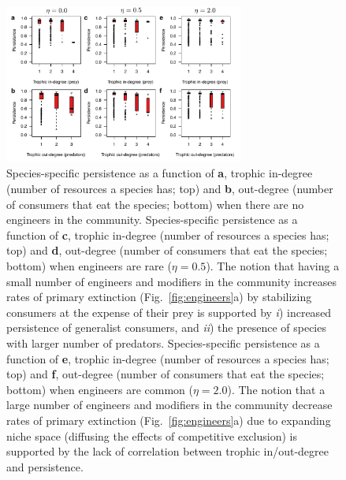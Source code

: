 \documentclass[twocolumn,preprintnumbers,amsmath,amssymb,superscriptaddress,linenumbers]{revtex4-1}
\begin{document}
\begin{figure}[h!]
\centering
\includegraphics[width=0.7\textwidth]{fig_indeng_combined.pdf}
\caption{
Species-specific persistence as a function of \textbf{a}, trophic in-degree (number of resources a species has; top) and \textbf{b}, out-degree (number of consumers that eat the species; bottom) when there are no engineers in the community. 
Species-specific persistence as a function of \textbf{c}, trophic in-degree (number of resources a species has; top) and \textbf{d}, out-degree (number of consumers that eat the species; bottom) when engineers are rare ($\eta = 0.5$).
The notion that having a small number of engineers and modifiers in the community increases rates of primary extinction (Fig.\ \ref{fig:engineers}a) by stabilizing consumers at the expense of their prey is supported by \emph{i}) increased persistence of generalist consumers, and \emph{ii}) the presence of species with larger number of predators.
Species-specific persistence as a function of \textbf{e}, trophic in-degree (number of resources a species has; top) and \textbf{f}, out-degree (number of consumers that eat the species; bottom) when engineers are common ($\eta = 2.0$).
The notion that a large number of engineers and modifiers in the community decrease rates of primary extinction (Fig.\ \ref{fig:engineers}a) due to expanding niche space (diffusing the effects of competitive exclusion) is supported by the lack of correlation between trophic in/out-degree and persistence.
}
\label{fig:indeng}
\end{figure}
\end{document}

